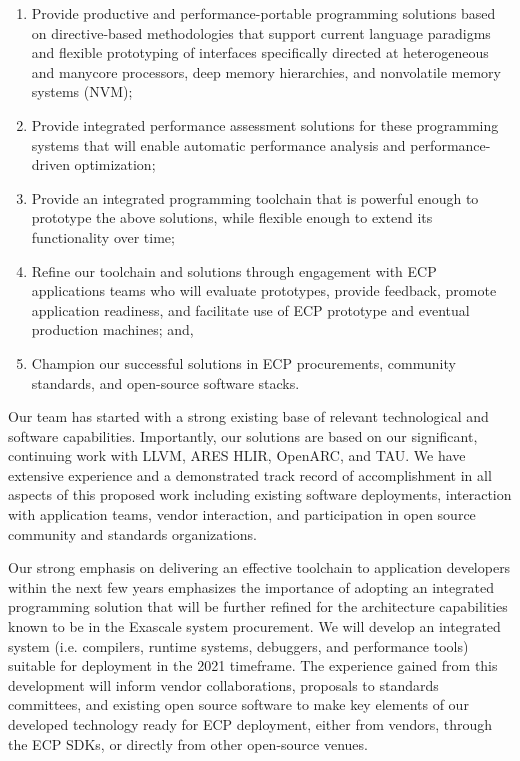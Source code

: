 \begin{enumerate}
    
    \item Provide productive and performance-portable programming solutions based on directive-based methodologies that support current language paradigms and flexible prototyping of interfaces specifically directed at heterogeneous and manycore processors, deep memory hierarchies, and nonvolatile memory systems (NVM);
    
    \item Provide integrated performance assessment solutions for these programming systems that will enable automatic performance analysis and performance-driven optimization;
    
    \item Provide an integrated programming toolchain that is powerful enough to prototype the above solutions, while flexible enough to extend its functionality over time;
    
    \item Refine our toolchain and solutions through engagement with ECP applications teams who will evaluate prototypes, provide feedback, promote application readiness, and facilitate use of ECP prototype and eventual production machines; and,
    
    \item Champion our successful solutions in ECP procurements, community standards, and open-source software stacks.
    
\end{enumerate}

Our team has started with a strong existing base of relevant technological and software capabilities. Importantly, our solutions are based on our significant, continuing work with LLVM, ARES HLIR, OpenARC, and TAU. We have extensive experience and a demonstrated track record of accomplishment in all aspects of this proposed work including existing software deployments, interaction with application teams, vendor interaction, and participation in open source community and standards organizations.

Our strong emphasis on delivering an effective toolchain to application developers within the next few years emphasizes the importance of adopting an integrated programming solution that will be further refined for the architecture capabilities known to be in the Exascale system procurement. We will develop an integrated system (i.e. compilers, runtime systems, debuggers, and performance tools) suitable for deployment in the 2021 timeframe. The experience gained from this development will inform vendor collaborations, proposals to standards committees, and existing open source software to make key elements of our developed technology ready for ECP deployment, either from vendors, through the ECP SDKs, or directly from other open-source venues.

